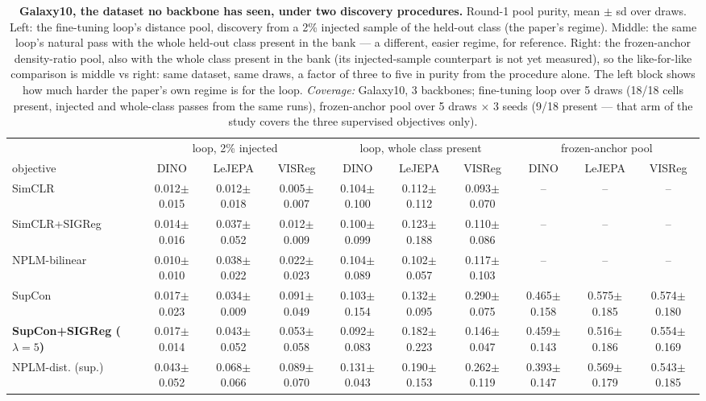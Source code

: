 \begin{landscape}
\begin{table}[p]
\centering
\footnotesize
\setlength{\tabcolsep}{3pt}
\begin{tabular}{lccccccccc}
\toprule
& \multicolumn{3}{c}{loop, 2\% injected} & \multicolumn{3}{c}{loop, whole class present} & \multicolumn{3}{c}{frozen-anchor pool} \\
\cmidrule(lr){2-4}\cmidrule(lr){5-7}\cmidrule(lr){8-10}
objective & DINO & LeJEPA & VISReg & DINO & LeJEPA & VISReg & DINO & LeJEPA & VISReg \\
\midrule
SimCLR & 0.012$\pm$0.015 & 0.012$\pm$0.018 & 0.005$\pm$0.007 & 0.104$\pm$0.100 & 0.112$\pm$0.112 & 0.093$\pm$0.070 & -- & -- & -- \\
SimCLR+SIGReg & 0.014$\pm$0.016 & 0.037$\pm$0.052 & 0.012$\pm$0.009 & 0.100$\pm$0.099 & 0.123$\pm$0.188 & 0.110$\pm$0.086 & -- & -- & -- \\
NPLM-bilinear & 0.010$\pm$0.010 & 0.038$\pm$0.022 & 0.022$\pm$0.023 & 0.104$\pm$0.089 & 0.102$\pm$0.057 & 0.117$\pm$0.103 & -- & -- & -- \\
SupCon & 0.017$\pm$0.023 & 0.034$\pm$0.009 & 0.091$\pm$0.049 & 0.103$\pm$0.154 & 0.132$\pm$0.095 & 0.290$\pm$0.075 & 0.465$\pm$0.158 & 0.575$\pm$0.185 & 0.574$\pm$0.180 \\
\textbf{SupCon+SIGReg ($\lambda{=}5$)} & 0.017$\pm$0.014 & 0.043$\pm$0.052 & 0.053$\pm$0.058 & 0.092$\pm$0.083 & 0.182$\pm$0.223 & 0.146$\pm$0.047 & 0.459$\pm$0.143 & 0.516$\pm$0.186 & 0.554$\pm$0.169 \\
NPLM-dist. (sup.) & 0.043$\pm$0.052 & 0.068$\pm$0.066 & 0.089$\pm$0.070 & 0.131$\pm$0.043 & 0.190$\pm$0.153 & 0.262$\pm$0.119 & 0.393$\pm$0.147 & 0.569$\pm$0.179 & 0.543$\pm$0.185 \\
\bottomrule
\end{tabular}
\caption{\textbf{Galaxy10, the dataset no backbone has seen, under two discovery procedures.} Round-1 pool purity, mean $\pm$ sd over draws. Left: the fine-tuning loop's distance pool, discovery from a 2\% injected sample of the held-out class (the paper's regime). Middle: the same loop's natural pass with the whole held-out class present in the bank --- a different, easier regime, for reference. Right: the frozen-anchor density-ratio pool, also with the whole class present in the bank (its injected-sample counterpart is not yet measured), so the like-for-like comparison is middle vs right: same dataset, same draws, a factor of three to five in purity from the procedure alone. The left block shows how much harder the paper's own regime is for the loop. \emph{Coverage:} Galaxy10, 3 backbones; fine-tuning loop over 5 draws (18/18 cells present, injected and whole-class passes from the same runs), frozen-anchor pool over 5 draws $\times$ 3 seeds (9/18 present --- that arm of the study covers the three supervised objectives only).}
\label{tab:galaxy}
\end{table}
\end{landscape}
